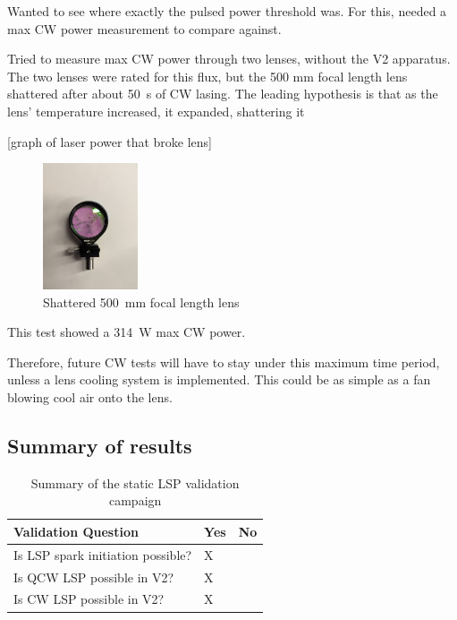             Wanted to see where exactly the pulsed power threshold was. For this, needed a max CW power measurement to compare against. 
    
            Tried to measure max CW power through two lenses, without the V2 apparatus. The two lenses were rated for this flux, but the 500 mm focal length lens shattered after about \qty{50}{s} of CW lasing. The leading hypothesis is that as the lens' temperature increased, it expanded, shattering it
    
            [graph of laser power that broke lens]
    
            \begin{figure}[!ht]
                \centering
                \includegraphics[width=0.25\textwidth]{assets/4 experiments/Shattered 500 mm lens.jpg}
                \caption{Shattered \qty{500}{mm} focal length lens}
            \end{figure}
    
            This test showed a \qty{314}{W} max CW power.
    
            Therefore, future CW tests will have to stay under this maximum time period, unless a lens cooling system is implemented. This could be as simple as a fan blowing cool air onto the lens.


        \subsection{Summary of results}

            \begin{table}[!ht]
                \centering
                \caption{Summary of the static LSP validation campaign}
                \label{tab:validation}
                \begin{tabular}{@{}lll@{}}
                \toprule
                Validation Question               & Yes & No \\ \midrule
                Is LSP spark initiation possible? & X   &    \\
                Is QCW LSP possible in V2?        & X   &    \\
                Is CW LSP possible in V2?         & X   &   
                \end{tabular}
            \end{table}


